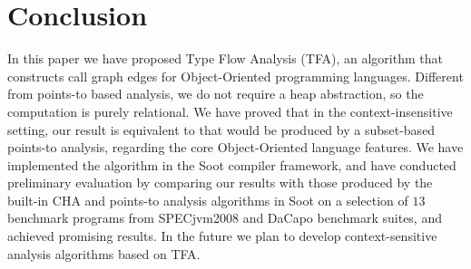 \documentclass{llncs}
\begin{document}
\section{Conclusion}\label{sec:conclusion}

In this paper we have proposed Type Flow Analysis (TFA), an algorithm that constructs call graph edges for Object-Oriented programming languages. Different from points-to based analysis, we do not require a heap abstraction, so the computation is purely relational. We have proved that in the context-insensitive setting, our result is equivalent to that would be produced by a subset-based points-to analysis, regarding the core Object-Oriented language features. We have implemented the algorithm in the Soot compiler framework, and have conducted preliminary evaluation by comparing our results with those produced by the built-in CHA and points-to analysis algorithms in Soot on a selection of $13$ benchmark programs from SPECjvm2008 and DaCapo benchmark suites, and achieved promising results. In the future we plan to develop context-sensitive analysis algorithms based on TFA.



\end{document}
